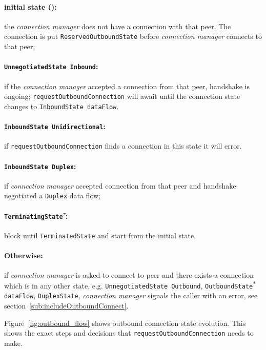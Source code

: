 \documentclass{article}
\def\InitialState{\textbullet}
\def\ReservedOutboundState{\texttt{ReservedOutboundState}}
\def\UnnegotiatedStateOut{\texttt{UnnegotiatedState Outbound}}
\def\UnnegotiatedStateIn{\texttt{UnnegotiatedState Inbound}}
\def\OutboundStateAny{\texttt{OutboundState\textsuperscript{*} dataFlow}}
\def\DuplexState{\texttt{DuplexState}}
\def\InboundStateUni{\texttt{InboundState Unidirectional}}
\def\InboundStateDup{\texttt{InboundState Duplex}}
\def\InboundStateAny{\texttt{InboundState dataFlow}}
\def\TerminatingState{\texttt{TerminatingState\textsuperscript{$\tau$}}}
\def\TerminatedState{\texttt{TerminatedState}}
\def\connmngr{\textit{connection manager}}
\begin{document}
\paragraph{\textnormal{initial state (\InitialState{})}:} the \connmngr{} does not have
  a connection with that peer.  The  connection is put \ReservedOutboundState{}
  before \connmngr{} connects to that peer;

\paragraph{\UnnegotiatedStateIn{}:} if the \connmngr{} accepted
  a connection from that peer, handshake is ongoing;
  \texttt{requestOutboundConnection} will await until the connection state
  changes to \InboundStateAny{}.

\paragraph{\InboundStateUni{}:} if \texttt{requestOutboundConnection} finds
a connection in this state it will error.

\paragraph{\InboundStateDup{}:} if \connmngr{} accepted connection from
  that peer and handshake negotiated a \texttt{Duplex} data flow;

\paragraph{\TerminatingState{}:} block until \TerminatedState{} and start from
the initial state.

\paragraph{\textnormal{Otherwise}:} if \connmngr{} is asked to connect to
peer and there exists a connection which is in any other state, e.g.
\UnnegotiatedStateOut{}, \OutboundStateAny{}, \DuplexState{}, \connmngr{} signals the caller with an error, see
section~\ref{sub:includeOutboundConnect}.

Figure~\ref{fig:outbound_flow} shows outbound connection state evolution.  This
shows the exact steps and decisions that \texttt{requestOutboundConnection}
needs to make.
\end{document}
